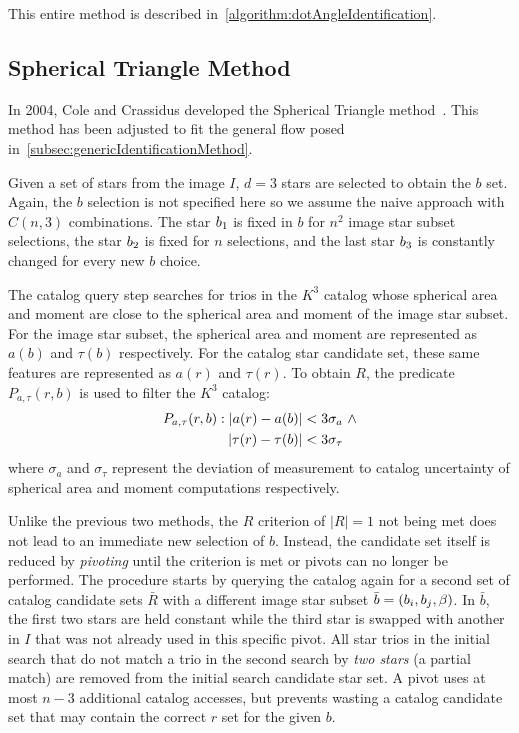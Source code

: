 This entire method is described in~\autoref{algorithm:dotAngleIdentification}.

\subsection{Spherical Triangle Method}\label{subsec:sphericalTriangleMethod}
In 2004, Cole and Crassidus developed the Spherical Triangle method~\cite{Spherical}.
This method has been adjusted to fit the general flow posed in~\autoref{subsec:genericIdentificationMethod}.

Given a set of stars from the image $I$, $d = 3$ stars are selected to obtain the $b$ set.
Again, the $b$ selection is not specified here so we assume the naive approach with $C(n, 3)$ combinations.
The star $b_1$ is fixed in $b$ for $n^2$ image star subset selections, the star $b_2$ is fixed for
$n$ selections, and the last star $b_3$ is constantly changed for every new $b$ choice.

The catalog query step searches for trios in the $K^3$ catalog whose spherical area and moment
are close to the spherical area and moment of the image star subset.
For the image star subset, the spherical area and moment are represented as $a(b)$ and $\tau(b)$ respectively.
For the catalog star candidate set, these same features are represented as $a(r)$ and $\tau(r)$.
To obtain $R$, the predicate $P_{a, \tau}(r, b)$ is used to filter the $K^3$ catalog:
\begin{equation}
    \begin{aligned}
        P_{a, \tau}(r, b) : \left|  a(r) - a(b) \right| &< 3\sigma_{a}
        \ \land \\ \left| \tau(r) - \tau(b) \right| &< 3\sigma_{\tau}
    \end{aligned}
\end{equation}
where $\sigma_a$ and $\sigma_\tau$ represent the deviation of measurement to catalog uncertainty of spherical area
and moment computations respectively.

Unlike the previous two methods, the $R$ criterion of $|R| = 1$ not being met does not lead to an immediate new
selection of $b$.
Instead, the candidate set itself is reduced by \textit{pivoting} until the criterion is met or pivots can no longer
be performed.
The procedure starts by querying the catalog again for a second set of catalog candidate sets $\bar{R}$ with a
different image star subset $\bar{b} = \left(b_i, b_j, \beta\right)$.
In $\bar{b}$, the first two stars are held constant while the third star is swapped with another in $I$ that was not
already used in this specific pivot.
All star trios in the initial search that do not match a trio in the second search by \textit{two stars} (a partial
match) are removed from the initial search candidate star set.
A pivot uses at most $n - 3$ additional catalog accesses, but prevents wasting a catalog candidate set that may contain
the correct $r$ set for the given $b$.

